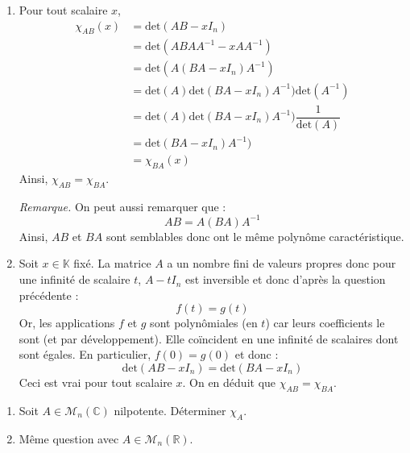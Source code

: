 \documentclass[a4paper,10pt]{report}
\begin{document}
\begin{enumerate}
\item Pour tout scalaire $x$,
\begin{align*}
\chi_{AB}(x) & = \textrm{det}(AB-xI_n) \\
& = \textrm{det}(ABAA^{-1}-xA A^{-1}) \\
& = \textrm{det}(A(BA-xI_n) A^{-1}) \\
& = \textrm{det}(A)\textrm{det}(BA-xI_n) A^{-1})\textrm{det}(A^{-1}) \\
& = \textrm{det}(A)\textrm{det}(BA-xI_n) A^{-1}) \dfrac{1}{\textrm{det}(A)} \\
& = \textrm{det}(BA-xI_n) A^{-1}) \\
& = \chi_{BA}(x)
\end{align*}
Ainsi, $\chi_{AB}= \chi_{BA}$.

\medskip

\noindent \textit{Remarque.} On peut aussi remarquer que :
$$ AB=  A(BA)A^{-1}$$
Ainsi, $AB$ et $BA$ sont semblables donc ont le même polynôme caractéristique.
\item Soit $x \in \mathbb{K}$ fixé. La matrice $A$ a un nombre fini de valeurs propres donc pour une infinité de scalaire $t$, $A-t I_n$ est inversible et donc d'après la question précédente :
$$ f(t)=g(t)$$
Or, les applications $f$ et $g$ sont polynômiales (en $t$) car leurs coefficients le sont (et par développement). Elle coïncident en une infinité de scalaires dont sont égales. En particulier, $f(0)=g(0)$ et donc :
$$ \textrm{det}(AB-xI_n)= \textrm{det}(BA-xI_n)$$
Ceci est vrai pour tout scalaire $x$. On en déduit que $\chi_{AB}= \chi_{BA}$.
\end{enumerate}

\begin{Exa}
  \begin{enumerate}
  \item  Soit $A \in \mathcal{M}_{n}(\mathbb{C})$ nilpotente. Déterminer $\chi_{A}$.
  \item Même question avec $A \in \mathcal{M}_{n}(\mathbb{R})$.
  \end{enumerate}
\end{Exa} 

\corr 
\end{document}
